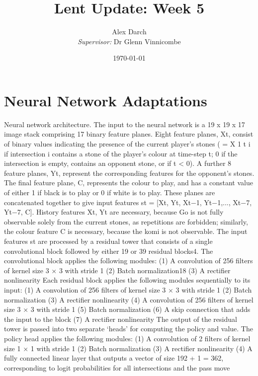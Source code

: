 \documentclass[11.7pt]{article}
\author{Alex Darch \\
   \textit{Supervisor:} Dr Glenn Vinnicombe}
\title{Lent Update: Week 5}
\date{\today}
\begin{document}
%

\maketitle

\section{Neural Network Adaptations}

Neural network architecture. The input to the neural network is a 19 x 19 x 17
image stack comprising 17 binary feature planes. Eight feature planes, Xt, consist
of binary values indicating the presence of the current player’s stones ( = X 1 t
i if
intersection i contains a stone of the player’s colour at time-step t; 0 if the intersection
is empty, contains an opponent stone, or if t < 0). A further 8 feature planes,
Yt, represent the corresponding features for the opponent’s stones. The final feature
plane, C, represents the colour to play, and has a constant value of either 1 if black
is to play or 0 if white is to play. These planes are concatenated together to give
input features st = [Xt, Yt, Xt−1, Yt−1,..., Xt−7, Yt−7, C]. History features Xt, Yt are
necessary, because Go is not fully observable solely from the current stones, as
repetitions are forbidden; similarly, the colour feature C is necessary, because the
komi is not observable.
The input features st are processed by a residual tower that consists of a single
convolutional block followed by either 19 or 39 residual blocks4.
The convolutional block applies the following modules:
(1) A convolution of 256 filters of kernel size 3 × 3 with stride 1
(2) Batch normalization18
(3) A rectifier nonlinearity
Each residual block applies the following modules sequentially to its input:
(1) A convolution of 256 filters of kernel size 3 × 3 with stride 1
(2) Batch normalization
(3) A rectifier nonlinearity
(4) A convolution of 256 filters of kernel size 3 × 3 with stride 1
(5) Batch normalization
(6) A skip connection that adds the input to the block
(7) A rectifier nonlinearity
The output of the residual tower is passed into two separate ‘heads’ for
computing the policy and value. The policy head applies the following modules:
(1) A convolution of 2 filters of kernel size 1 × 1 with stride 1
(2) Batch normalization
(3) A rectifier nonlinearity
(4) A fully connected linear layer that outputs a vector of size 192 + 1 = 362,
corresponding to logit probabilities for all intersections and the pass move
\end{document}
